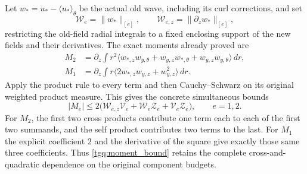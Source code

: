 Let $w_*=u_*-\langle u_*\rangle_\theta$ be the actual old wave,
including its curl corrections, and set
\[
 \mathcal W_e=\|w_*\|_{[e]},\qquad
 \mathcal W_{e,z}=\|\partial_zw_*\|_{[e]},
\]
restricting the old-field radial integrals to a fixed enclosing support
of the new fields and their derivatives. The exact moments already
proved are
\begin{align*}
 M_2&=\partial_z\int r^2
   \langle w_{*,z}w_{y,\theta}+w_{y,z}w_{*,\theta}
                         +w_{y,z}w_{y,\theta}\rangle\,dr,\\
 M_1&=\partial_z\int r
   \langle2w_{*,z}w_{y,z}+w_{y,z}^2\rangle\,dr .
\end{align*}
Apply the product rule to every term and then Cauchy--Schwarz on its
original weighted product measure. This gives the concrete simultaneous
bounds
\begin{equation}
 |M_e|\le
 2\bigl(\mathcal W_{e,z}\mathcal V_e+
         \mathcal W_e\mathcal Z_e+
         \mathcal V_e\mathcal Z_e\bigr),\qquad e=1,2.
 \label{tgq:moment_bound}
\end{equation}
For $M_2$, the first two cross products contribute one term each to
each of the first two summands, and the self product contributes two
terms to the last. For $M_1$ the explicit coefficient $2$ and the
derivative of the square give exactly those same three coefficients.
Thus \eqref{tgq:moment_bound} retains the complete cross-and-quadratic
dependence on the original component budgets.

